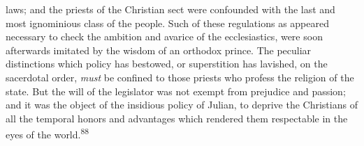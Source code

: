 laws; and the priests of the Christian sect were confounded with
the last and most ignominious class of the people. Such of these
regulations as appeared necessary to check the ambition and
avarice of the ecclesiastics, were soon afterwards imitated by
the wisdom of an orthodox prince. The peculiar distinctions which
policy has bestowed, or superstition has lavished, on the
sacerdotal order, \textit{must} be confined to those priests who profess
the religion of the state. But the will of the legislator was not
exempt from prejudice and passion; and it was the object of the
insidious policy of Julian, to deprive the Christians of all the
temporal honors and advantages which rendered them respectable in
the eyes of the world.\textsuperscript{88}




